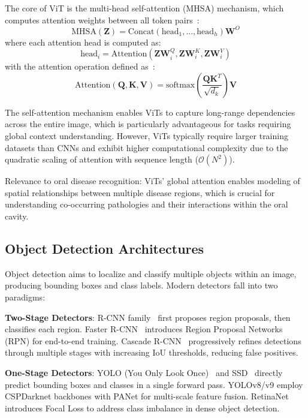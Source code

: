 The core of ViT is the multi-head self-attention (MHSA) mechanism, which computes attention weights between all token pairs~\cite{ali2025interpretable}:
\begin{equation}
\text{MHSA}(\mathbf{Z}) = \text{Concat}(\text{head}_1, ..., \text{head}_h)\mathbf{W}^O
\end{equation}
where each attention head is computed as:
\begin{equation}
\text{head}_i = \text{Attention}(\mathbf{Z}\mathbf{W}_i^Q, \mathbf{Z}\mathbf{W}_i^K, \mathbf{Z}\mathbf{W}_i^V)
\end{equation}
with the attention operation defined as~\cite{ali2025interpretable}:
\begin{equation}
\text{Attention}(\mathbf{Q}, \mathbf{K}, \mathbf{V}) = \text{softmax}\left(\frac{\mathbf{Q}\mathbf{K}^T}{\sqrt{d_k}}\right)\mathbf{V}
\end{equation}

The self-attention mechanism enables ViTs to capture long-range dependencies across the entire image, which is particularly advantageous for tasks requiring global context understanding. However, ViTs typically require larger training datasets than CNNs and exhibit higher computational complexity due to the quadratic scaling of attention with sequence length ($\mathcal{O}(N^2)$).

Relevance to oral disease recognition: ViTs' global attention enables modeling of spatial relationships between multiple disease regions, which is crucial for understanding co-occurring pathologies and their interactions within the oral cavity.

\subsection{Object Detection Architectures}

Object detection aims to localize and classify multiple objects within an image, producing bounding boxes and class labels. Modern detectors fall into two paradigms:

\textbf{Two-Stage Detectors}: R-CNN family~\cite{girshick2014rcnn} first proposes region proposals, then classifies each region. Faster R-CNN~\cite{ren2015faster} introduces Region Proposal Networks (RPN) for end-to-end training. Cascade R-CNN~\cite{cai2018cascade} progressively refines detections through multiple stages with increasing IoU thresholds, reducing false positives.

\textbf{One-Stage Detectors}: YOLO (You Only Look Once)~\cite{redmon2016yolo} and SSD~\cite{liu2016ssd} directly predict bounding boxes and classes in a single forward pass. YOLOv8/v9 employ CSPDarknet backbones with PANet for multi-scale feature fusion. RetinaNet~\cite{lin2017focal} introduces Focal Loss to address class imbalance in dense object detection.

